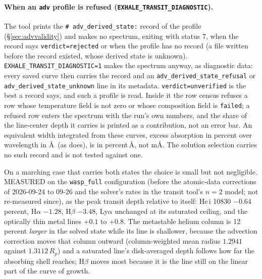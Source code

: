 \documentclass[english,a4paper]{my_memo}
\begin{document}
\paragraph{When an \texttt{adv} profile is refused (\texttt{EXHALE\_TRANSIT\_DIAGNOSTIC}).}
The tool prints the \texttt{\# adv\_derived\_state:} record of the profile
(\S\ref{sec:advvalidity}) and makes no spectrum, exiting with status 7, when
the record says \texttt{verdict=rejected} or when the profile has no record
(a file written before the record existed, whose derived state is unknown).
\texttt{EXHALE\_TRANSIT\_DIAGNOSTIC=1} makes the spectrum anyway, as
diagnostic data: every saved curve then carries the record and an
\texttt{adv\_derived\_state\_refusal} or \texttt{adv\_derived\_state\_unknown}
line in its metadata. \texttt{verdict=unverified} is the best a record says,
and such a profile is read. Inside it the row census refuses a row whose
temperature field is not zero or whose composition field is \texttt{failed};
a refused row enters the spectrum with the run's own numbers, and the share of
the line-center depth it carries is printed as a contribution, not an error
bar. An equivalent width integrated from these curves, excess absorption in
percent over wavelength in \AA\ (as 
does), is in percent\,\AA, not m\AA. The solution selection carries no such record and
is not tested against one.

On a marching case that carries both states the choice is small but not
negligible.  MEASURED on the \texttt{wasp\_full} configuration (before the
atomic-data corrections of 2026-09-24 to 09-26 and the solver's rates in the
transit tool's $n{=}2$ model; not re-measured since), as the peak
transit depth relative to itself: He\,{\sc i} 10830 $-0.64$ percent,
H$\alpha$ $-1.28$, H$\beta$ $-3.48$, Ly$\alpha$ unchanged at its saturated
ceiling, and the optically thin metal lines $+0.1$ to $+0.8$.  The metastable
helium column is 12 percent \emph{larger} in the solved state while its line
is shallower, because the advection correction moves that column outward
(column-weighted mean radius $1.2941$ against $1.3112\,R_p$) and a saturated
line's disk-averaged depth follows how far the absorbing shell reaches;
H$\beta$ moves most because it is the line still on the linear part of the
curve of growth.
\end{document}
